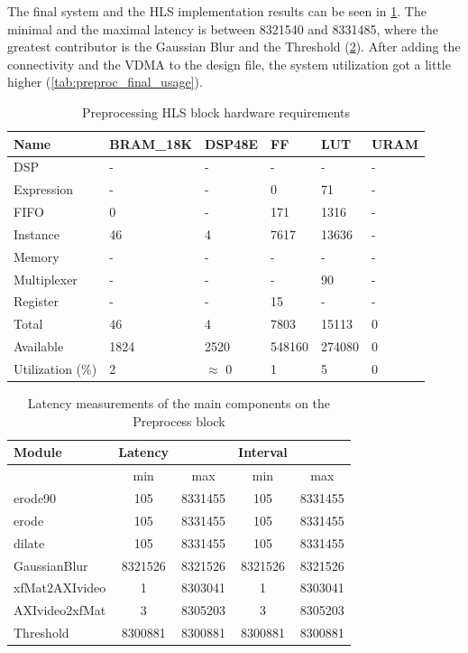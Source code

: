 The final system and the HLS implementation results can be seen in \cref{tab:preproc_hls_usage}.
The minimal and the maximal latency is between 8321540 and 8331485, where the greatest contributor is the Gaussian Blur and the Threshold (\cref{tab:preproc_hls_latency}).
After adding the connectivity and the VDMA to the design file, the system utilization got a little higher (\cref{tab:preproc_final_usage}).

\begin{table}
    \centering
    \caption{Preprocessing HLS block hardware requirements}
    \label{tab:preproc_hls_usage}
    \begin{tabular}{|l|l|l|l|l|l|}
    \hline
    Name &  BRAM\_18K &  DSP48E &  FF &  LUT &  URAM \\ \hline
    DSP & - & - & - & - & - \\ \hline
    Expression & - & - & 0 & 71 & - \\ \hline
    FIFO & 0 & - & 171 & 1316 & - \\ \hline
    Instance & 46 & 4 & 7617 & 13636 & - \\ \hline
    Memory & - & - & - & - & - \\ \hline
    Multiplexer & - & - & - & 90 & - \\ \hline
    Register & - & - & 15 & - & - \\ \hline
    Total & 46 & 4 & 7803 & 15113 & 0 \\ \hline
    Available & 1824 & 2520 & 548160 & 274080 & 0 \\ \hline
    Utilization (\%) & 2 & $\approx$ 0 & 1 & 5 & 0 \\ \hline
    \end{tabular}
\end{table}

\begin{table}
    \centering
    \caption{Latency measurements of the main components on the Preprocess block}
    \label{tab:preproc_hls_latency}
    \begin{tabular}{|l|c|c|c|c|}
    \hline
    Module & Latency & & Interval \\ \hline
    & min &  max &  min &  max \\ \hline
    erode90 & 105 & 8331455 & 105 & 8331455 \\ \hline
    erode & 105 & 8331455 & 105 & 8331455 \\ \hline
    dilate & 105 & 8331455 & 105 & 8331455 \\ \hline
    GaussianBlur & 8321526 & 8321526 & 8321526 & 8321526  \\ \hline
    xfMat2AXIvideo & 1 & 8303041 & 1 & 8303041 \\ \hline
    AXIvideo2xfMat & 3 & 8305203 & 3 & 8305203 \\ \hline
    Threshold & 8300881 & 8300881 & 8300881 & 8300881 \\ \hline
    \end{tabular}
\end{table}

